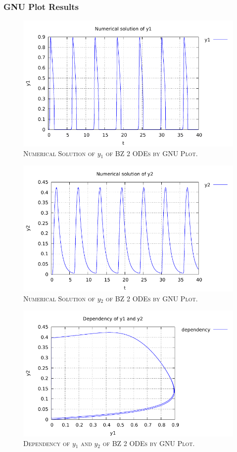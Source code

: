\documentclass[a4paper,oneside]{book}
\numberwithin{equation}{chapter}
\begin{document}
\subsubsection{GNU Plot Results}
\begin{figure}[H]
\centering
\includegraphics[scale=1.1]{bz2_1}
\caption{\textsc{Numerical Solution of $y_1$ of BZ 2 ODEs by GNU Plot.}}
\end{figure}
\begin{figure}[H]
\centering
\includegraphics[scale=1.1]{bz2_2}
\caption{\textsc{Numerical Solution of $y_2$ of BZ 2 ODEs by GNU Plot.}}
\end{figure}
\begin{figure}[H]
\centering
\includegraphics[scale=1.1]{bz2_d_1_2}
\caption{\textsc{Dependency of $y_1$ and $y_2$ of BZ 2 ODEs by GNU Plot.}}
\end{figure}
\end{document}
